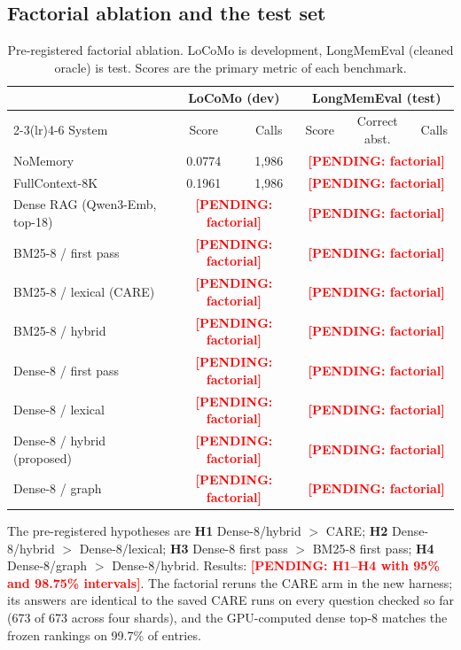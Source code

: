 \documentclass[10pt]{article}
\theoremstyle{plain}
\theoremstyle{definition}
\newcommand{\care}{\textsc{CARE}}
\newcommand{\pending}[1]{\textcolor{red}{\textbf{[PENDING: #1]}}}
\begin{document}
\subsection{Factorial ablation and the test set}
\label{sec:ablation}

\begin{table}[t]
\centering
\caption{Pre-registered factorial ablation. LoCoMo is development, LongMemEval (cleaned oracle) is test.
Scores are the primary metric of each benchmark.}
\label{tab:ablation}
\small
\begin{tabular}{lccccc}
\toprule
 & \multicolumn{2}{c}{LoCoMo (dev)} & \multicolumn{3}{c}{LongMemEval (test)} \\
\cmidrule(lr){2-3}\cmidrule(lr){4-6}
System & Score & Calls & Score & Correct abst. & Calls \\
\midrule
NoMemory & 0.0774 & 1,986 & \multicolumn{3}{c}{\pending{factorial}} \\
FullContext-8K & 0.1961 & 1,986 & \multicolumn{3}{c}{\pending{factorial}} \\
Dense RAG (Qwen3-Emb, top-18) & \multicolumn{2}{c}{\pending{factorial}} & \multicolumn{3}{c}{\pending{factorial}} \\
BM25-8 / first pass & \multicolumn{2}{c}{\pending{factorial}} & \multicolumn{3}{c}{\pending{factorial}} \\
BM25-8 / lexical (\care{}) & \multicolumn{2}{c}{\pending{factorial}} & \multicolumn{3}{c}{\pending{factorial}} \\
BM25-8 / hybrid & \multicolumn{2}{c}{\pending{factorial}} & \multicolumn{3}{c}{\pending{factorial}} \\
Dense-8 / first pass & \multicolumn{2}{c}{\pending{factorial}} & \multicolumn{3}{c}{\pending{factorial}} \\
Dense-8 / lexical & \multicolumn{2}{c}{\pending{factorial}} & \multicolumn{3}{c}{\pending{factorial}} \\
Dense-8 / hybrid (proposed) & \multicolumn{2}{c}{\pending{factorial}} & \multicolumn{3}{c}{\pending{factorial}} \\
Dense-8 / graph & \multicolumn{2}{c}{\pending{factorial}} & \multicolumn{3}{c}{\pending{factorial}} \\
\bottomrule
\end{tabular}
\end{table}

The pre-registered hypotheses are \textbf{H1} Dense-8/hybrid $>$ \care{}; \textbf{H2} Dense-8/hybrid $>$
Dense-8/lexical; \textbf{H3} Dense-8 first pass $>$ BM25-8 first pass; \textbf{H4} Dense-8/graph $>$
Dense-8/hybrid. Results: \pending{H1--H4 with 95\% and 98.75\% intervals}. The factorial reruns the
\care{} arm in the new harness; its answers are identical to the saved \care{} runs on every question
checked so far (673 of 673 across four shards), and the GPU-computed dense top-8 matches the frozen
rankings on 99.7\% of entries.
\end{document}
